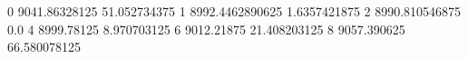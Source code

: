 0 9041.86328125 51.052734375
1 8992.4462890625 1.6357421875
2 8990.810546875 0.0
4 8999.78125 8.970703125
6 9012.21875 21.408203125
8 9057.390625 66.580078125
